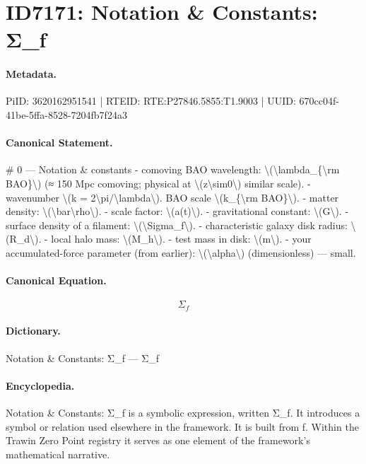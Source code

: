 \section*{ID7171: Notation \& Constants: Σ\_f}
\paragraph{Metadata.}
PiID: 3620162951541 | RTEID: RTE:P27846.5855:T1.9003 | UUID: 670cc04f-41be-5ffa-8528-7204fb7f24a3

\paragraph{Canonical Statement.}
\# 0 — Notation \& constants - comoving BAO wavelength: \textbackslash{}(\textbackslash{}lambda\_\{\textbackslash{}rm BAO\}\textbackslash{}) (≈ 150 Mpc comoving; physical at \textbackslash{}(z\textbackslash{}sim0\textbackslash{}) similar scale). - wavenumber \textbackslash{}(k = 2\textbackslash{}pi/\textbackslash{}lambda\textbackslash{}). BAO scale \textbackslash{}(k\_\{\textbackslash{}rm BAO\}\textbackslash{}). - matter density: \textbackslash{}(\textbackslash{}bar\textbackslash{}rho\textbackslash{}). - scale factor: \textbackslash{}(a(t)\textbackslash{}). - gravitational constant: \textbackslash{}(G\textbackslash{}). - surface density of a filament: \textbackslash{}(\textbackslash{}Sigma\_f\textbackslash{}). - characteristic galaxy disk radius: \textbackslash{}(R\_d\textbackslash{}). - local halo mass: \textbackslash{}(M\_h\textbackslash{}). - test mass in disk: \textbackslash{}(m\textbackslash{}). - your accumulated-force parameter (from earlier): \textbackslash{}(\textbackslash{}alpha\textbackslash{}) (dimensionless) — small.

\paragraph{Canonical Equation.}
\[
\Sigma_f
\]

\paragraph{Dictionary.}
Notation \& Constants: Σ\_f — Σ\_f

\paragraph{Encyclopedia.}
Notation \& Constants: Σ\_f is a symbolic expression, written Σ\_f. It introduces a symbol or relation used elsewhere in the framework. It is built from f. Within the Trawin Zero Point registry it serves as one element of the framework's mathematical narrative.
